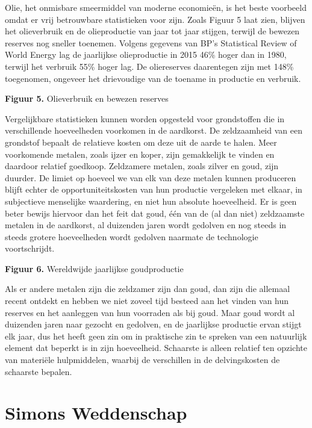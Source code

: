 Olie, het onmisbare smeermiddel van moderne economieën, is het beste
voorbeeld omdat er vrij betrouwbare statistieken voor zijn. Zoals Figuur
5 laat zien, blijven het olieverbruik en de olieproductie van jaar tot
jaar stijgen, terwijl de bewezen reserves nog sneller toenemen. Volgens
gegevens van BP's Statistical Review of World Energy lag de jaarlijkse
olieproductie in 2015 46\% hoger dan in 1980, terwijl het verbruik 55\%
hoger lag. De oliereserves daarentegen zijn met 148\% toegenomen,
ongeveer het drievoudige van de toename in productie en verbruik.

\textbf{Figuur 5.} Olieverbruik en bewezen reserves\autocite{34}

Vergelijkbare statistieken kunnen worden opgesteld voor grondstoffen die
in verschillende hoeveelheden voorkomen in de aardkorst. De zeldzaamheid
van een grondstof bepaalt de relatieve kosten om deze uit de aarde te
halen. Meer voorkomende metalen, zoals ijzer en koper, zijn gemakkelijk
te vinden en daardoor relatief goedkoop. Zeldzamere metalen, zoals
zilver en goud, zijn duurder. De limiet op hoeveel we van elk van deze
metalen kunnen produceren blijft echter de opportuniteitskosten van hun
productie vergeleken met elkaar, in subjectieve menselijke waardering,
en niet hun absolute hoeveelheid. Er is geen beter bewijs hiervoor dan
het feit dat goud, één van de (al dan niet) zeldzaamste metalen in de
aardkorst, al duizenden jaren wordt gedolven en nog steeds in steeds
grotere hoeveelheden wordt gedolven naarmate de technologie
voortschrijdt.

\textbf{Figuur 6.} Wereldwijde jaarlijkse goudproductie\autocite{35}

Als er andere metalen zijn die zeldzamer zijn dan goud, dan zijn die
allemaal recent ontdekt en hebben we niet zoveel tijd besteed aan het
vinden van hun reserves en het aanleggen van hun voorraden als bij goud.
Maar goud wordt al duizenden jaren naar gezocht en gedolven, en de
jaarlijkse productie ervan stijgt elk jaar, dus het heeft geen zin om in
praktische zin te spreken van een natuurlijk element dat beperkt is in
zijn hoeveelheid. Schaarste is alleen relatief ten opzichte van
materiële hulpmiddelen, waarbij de verschillen in de delvingskosten de
schaarste bepalen.

\section{Simons Weddenschap}

